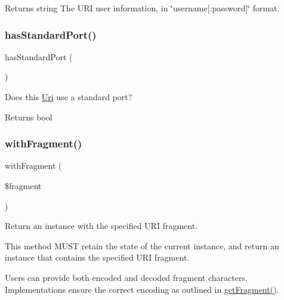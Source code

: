 \begin{DoxyReturn}{Returns}
string The U\+RI user information, in \char`\"{}username\mbox{[}\+:password\mbox{]}\char`\"{} format. 
\end{DoxyReturn}
\mbox{\label{class_pes_1_1_http_1_1_uri_a05b11cf88dd4ccc6e1f7be3026656eb6}} 
\subsubsection{\texorpdfstring{has\+Standard\+Port()}{hasStandardPort()}}
{\footnotesize\ttfamily has\+Standard\+Port (\begin{DoxyParamCaption}{ }\end{DoxyParamCaption})\hspace{0.3cm}{\ttfamily [protected]}}

Does this \mbox{\hyperlink{class_pes_1_1_http_1_1_uri}{Uri}} use a standard port?

\begin{DoxyReturn}{Returns}
bool 
\end{DoxyReturn}
\mbox{\label{class_pes_1_1_http_1_1_uri_ad701d145b88cbec94ca8b31112944b9c}} 
\subsubsection{\texorpdfstring{with\+Fragment()}{withFragment()}}
{\footnotesize\ttfamily with\+Fragment (\begin{DoxyParamCaption}\item[{}]{\$fragment }\end{DoxyParamCaption})}

Return an instance with the specified U\+RI fragment.

This method M\+U\+ST retain the state of the current instance, and return an instance that contains the specified U\+RI fragment.

Users can provide both encoded and decoded fragment characters. Implementations ensure the correct encoding as outlined in \mbox{\hyperlink{class_pes_1_1_http_1_1_uri_a8e9be93affbfde43840cbaf4b6712ea9}{get\+Fragment()}}.

